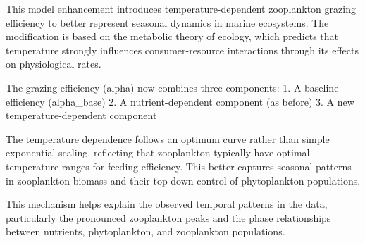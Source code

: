 This model enhancement introduces temperature-dependent zooplankton grazing efficiency to better represent seasonal dynamics in marine ecosystems. The modification is based on the metabolic theory of ecology, which predicts that temperature strongly influences consumer-resource interactions through its effects on physiological rates.

The grazing efficiency (alpha) now combines three components:
1. A baseline efficiency (alpha_base)
2. A nutrient-dependent component (as before)
3. A new temperature-dependent component

The temperature dependence follows an optimum curve rather than simple exponential scaling, reflecting that zooplankton typically have optimal temperature ranges for feeding efficiency. This better captures seasonal patterns in zooplankton biomass and their top-down control of phytoplankton populations.

This mechanism helps explain the observed temporal patterns in the data, particularly the pronounced zooplankton peaks and the phase relationships between nutrients, phytoplankton, and zooplankton populations.
